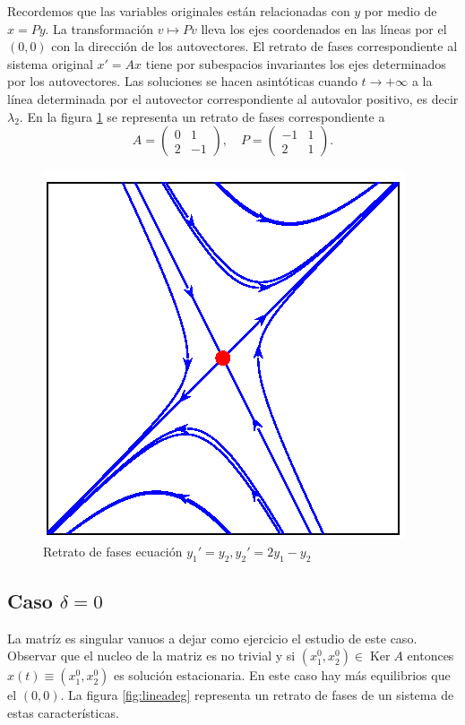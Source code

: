 Recordemos que las variables originales están relacionadas con $y$ por medio de $x=Py$. La transformación $v\mapsto Pv$ lleva los ejes coordenados en las líneas por el $(0,0)$ con la dirección de los autovectores. El retrato de fases correspondiente al sistema original $x'=Ax$ tiene por subespacios invariantes los ejes determinados por los autovectores. Las soluciones se hacen asintóticas cuando $t\to+\infty$ a la línea determinada por el autovector correspondiente al autovalor positivo, es decir $\lambda_2$.  En la figura \ref{fig:silla2} se representa un retrato de fases correspondiente a 
\[
 A=\begin{pmatrix}0 & 1\\2 & -1\end{pmatrix},\quad P=\begin{pmatrix}-1 & 1\\2 & 1\end{pmatrix}.
\]


\begin{figure}[h]
\begin{center}
\includegraphics[scale=.7]{imagenes/silla2.png}
\caption{Retrato de fases ecuación $y_1'=y_2, y_2'=2y_1-y_2$}\label{fig:silla2}
\end{center}
\end{figure}

\subsection{Caso $\delta=0$}  La matríz es singular vanuos a  dejar como  ejercicio el estudio de este caso. Observar que el nucleo de la matriz es no trivial y si $(x_1^0,x_2^0)\in\operatorname{Ker}A$ entonces $x(t)\equiv(x_1^0,x_2^0)$ es solución estacionaria. En este caso hay más equilibrios que el $(0,0)$. La figura \ref{fig:lineadeg} representa un retrato de fases de un sistema de estas características.


